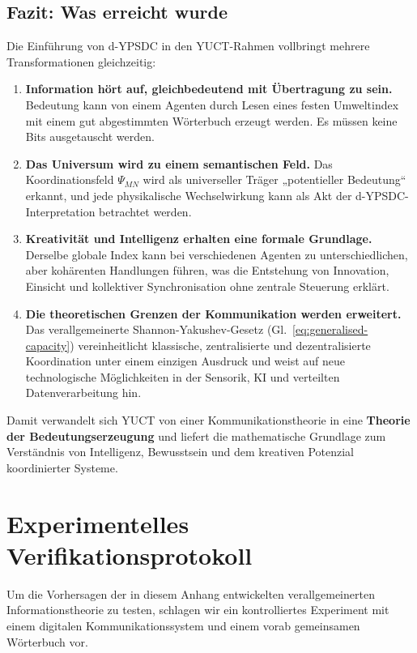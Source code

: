 \documentclass[12pt,a4paper]{article}
\theoremstyle{remark}
\begin{document}
	\subsection{Fazit: Was erreicht wurde}
	\label{subsec:conclusions-dypsdc}
	
	Die Einführung von d-YPSDC in den YUCT-Rahmen vollbringt mehrere Transformationen gleichzeitig:
	
	\begin{enumerate}[leftmargin=*]
		\item \textbf{Information hört auf, gleichbedeutend mit Übertragung zu sein.}
		Bedeutung kann von einem Agenten durch Lesen eines festen Umweltindex mit einem gut abgestimmten Wörterbuch erzeugt werden. Es müssen keine Bits ausgetauscht werden.
		\item \textbf{Das Universum wird zu einem semantischen Feld.}
		Das Koordinationsfeld $\Psi_{MN}$ wird als universeller Träger „potentieller Bedeutung“ erkannt, und jede physikalische Wechselwirkung kann als Akt der d-YPSDC-Interpretation betrachtet werden.
		\item \textbf{Kreativität und Intelligenz erhalten eine formale Grundlage.}
		Derselbe globale Index kann bei verschiedenen Agenten zu unterschiedlichen, aber kohärenten Handlungen führen, was die Entstehung von Innovation, Einsicht und kollektiver Synchronisation ohne zentrale Steuerung erklärt.
		\item \textbf{Die theoretischen Grenzen der Kommunikation werden erweitert.}
		Das verallgemeinerte Shannon-Yakushev-Gesetz (Gl.\ \ref{eq:generalised-capacity}) vereinheitlicht klassische, zentralisierte und dezentralisierte Koordination unter einem einzigen Ausdruck und weist auf neue technologische Möglichkeiten in der Sensorik, KI und verteilten Datenverarbeitung hin.
	\end{enumerate}
	
	Damit verwandelt sich YUCT von einer Kommunikationstheorie in eine \textbf{Theorie der Bedeutungserzeugung} und liefert die mathematische Grundlage zum Verständnis von Intelligenz, Bewusstsein und dem kreativen Potenzial koordinierter Systeme.
	
	\section{Experimentelles Verifikationsprotokoll}
	\label{sec:experiment}
	
	Um die Vorhersagen der in diesem Anhang entwickelten verallgemeinerten Informationstheorie zu testen, schlagen wir ein kontrolliertes Experiment mit einem digitalen Kommunikationssystem und einem vorab gemeinsamen Wörterbuch vor.
	
\end{document}
